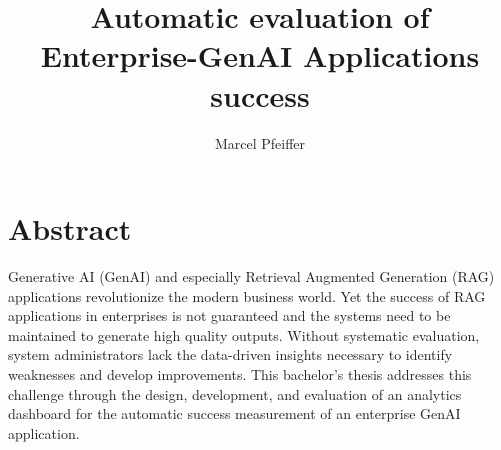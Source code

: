 \documentclass[
	english,
	ruledheaders=section,%
	class=report,%
	thesis={type=bachelor},%
	accentcolor=1b,%
	custommargins=true,%
	marginpar=false,%
	parskip=half-,%
	fontsize=11pt,%
	DIV=14,
]{tudapub}
\begin{document}


\title{Automatic evaluation of Enterprise-GenAI Applications success}

\author[M. Pfeiffer]{Marcel Pfeiffer}%


\submissiondate{\today}
\examdate{\today}


\maketitle

\affidavit


\chapter*{Abstract}
Generative AI (GenAI) and especially Retrieval Augmented Generation (RAG) applications revolutionize the modern business world. Yet the success of RAG applications in enterprises is not guaranteed and the systems need to be maintained to generate high quality outputs. Without systematic evaluation, system administrators lack the data-driven insights necessary to identify weaknesses and develop improvements. This bachelor's thesis addresses this challenge through the design, development, and evaluation of an analytics dashboard for the automatic success measurement of an enterprise GenAI application.
\end{document}
